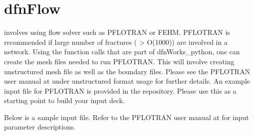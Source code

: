 \documentclass[letterpaper,10pt,english]{sphinxmanual}
\begin{document}
\begin{sphinxVerbatim}[commandchars=\\\{\}]
 

   

\end{sphinxVerbatim}


\chapter{dfnFlow}
\label{\detokenize{dfnflow:dfnflow}}\label{\detokenize{dfnflow::doc}}\label{\detokenize{dfnflow:dfnflow-chapter}}
 involves using flow solver such as PFLOTRAN or FEHM. PFLOTRAN is recommended if large number of fractures ( \textgreater{} O(1000)) are involved in a network. Using the function calls that are part of dfnWorks\_python, one can create the mesh files needed to run PFLOTRAN. This will involve creating unstructured mesh file  as well as the boundary   files. Please see the PFLOTRAN user manual at  under unstructured  format usage for further details. An example input file for PFLOTRAN is provided in the repository. Please use this as a starting point to build your input deck.

Below is a sample input file. Refer to the PFLOTRAN user manual at  for input parameter descriptions.
\end{document}
